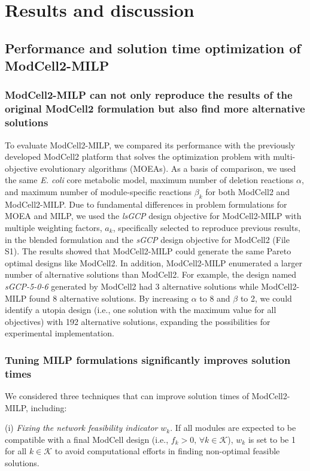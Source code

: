 \section{Results and discussion}

\subsection{Performance and solution time optimization of ModCell2-MILP}
\subsubsection{ModCell2-MILP can not only reproduce the results of the original ModCell2 formulation but also find more alternative solutions}
To evaluate ModCell2-MILP, we compared its performance with the previously developed ModCell2 platform\citep{garcia2019} that solves the optimization problem with multi-objective evolutionary algorithms (MOEAs). As a basis of comparison, we used the same \textit{E. coli} core metabolic model, maximum number of deletion reactions $\alpha$, and maximum number of module-specific reactions $\beta_k$ for both ModCell2 and ModCell2-MILP. Due to fundamental differences in problem formulations for MOEA and MILP, we used the \textit{lsGCP} design objective for ModCell2-MILP with multiple weighting factors, $a_k$, specifically selected to reproduce previous results, in the blended formulation and the \textit{sGCP} design objective for ModCell2 (File S1). The results showed that ModCell2-MILP could generate the same Pareto optimal designs like ModCell2. In addition, ModCell2-MILP enumerated a larger number of alternative solutions than ModCell2. For example, the design named \textit{sGCP-5-0-6} generated by ModCell2 had 3 alternative solutions while ModCell2-MILP found 8 alternative solutions. By increasing $\alpha$ to 8 and $\beta$ to 2, we could identify a utopia design (i.e., one solution with the maximum value for all objectives) with 192 alternative solutions, expanding the possibilities for experimental implementation.


\subsubsection{Tuning MILP formulations significantly improves solution times}
We considered three techniques that can improve solution times of ModCell2-MILP, including:

(i) \textit{Fixing the network feasibility indicator} $w_k$. If all modules are expected to be compatible with a final ModCell design (i.e., $f_k > 0,\, \forall k \in \mathcal{K}$), $w_k$ is set to be 1 for all $k \in \mathcal{K}$ to avoid computational efforts in finding non-optimal feasible solutions.

